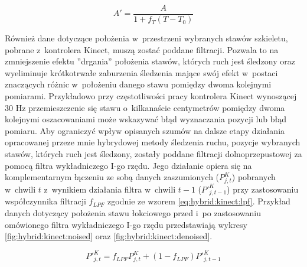 \begin{equation}
	A' = \frac{A}{1+f_T (T-T_0)}
	\label{eq:hybrid:temperatureCorrection}
\end{equation}

Również dane dotyczące położenia w~przestrzeni wybranych stawów szkieletu, pobrane z~kontrolera Kinect, muszą zostać poddane filtracji. Pozwala to na zmniejszenie efektu ''drgania'' położenia stawów, których ruch jest śledzony oraz wyeliminuje krótkotrwałe zaburzenia śledzenia mające swój efekt w~postaci znaczących różnic w~położeniu danego stawu pomiędzy dwoma kolejnymi pomiarami. 
Przykładowo przy częstotliwości pracy kontrolera Kinect wynoszącej 30 Hz przemieszczenie się stawu o~kilkanaście centymetrów pomiędzy dwoma kolejnymi oszacowaniami może wskazywać błąd wyznaczania pozycji lub błąd pomiaru. 
Aby ograniczyć wpływ opisanych szumów na dalsze etapy działania opracowanej przeze mnie hybrydowej metody śledzenia ruchu, pozycje wybranych stawów, których ruch jest śledzony, zostały poddane filtracji dolnoprzepustowej za pomocą filtra wykładniczego I-go rzędu. Jego działanie opiera się na komplementarnym łączeniu ze sobą danych zaszumionych ($P^K_{j,t}$) pobranych w~chwili $t$ z~wynikiem działania filtra w~chwili $t-1$ ($P'^K_{j,t-1}$) przy zastosowaniu współczynnika filtracji $f_{LPF}$ zgodnie ze wzorem \eqref{eq:hybrid:kinect:lpf}. Przykład danych dotyczący położenia stawu łokciowego przed i~po zastosowaniu omówionego filtra wykładniczego I-go rzędu przedstawiają wykresy \ref{fig:hybrid:kinect:noised} oraz \ref{fig:hybrid:kinect:denoised}.

\begin{equation}
	\label{eq:hybrid:kinect:lpf}
	P'^K_{j,t} = f_{LPF} P^K_{j,t} + (1-f_{LPF})P'^K_{j,t-1}
\end{equation}


